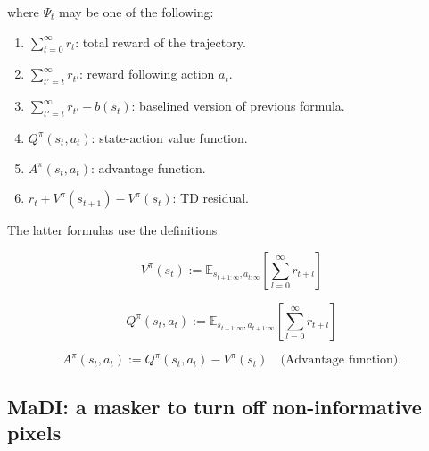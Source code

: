   where $\Psi_t$ may be one of the following:

  \begin{multicols}{2}
    \begin{enumerate}
        \item $\sum_{t=0}^{\infty} r_t$: total reward of the trajectory.
        \item $\sum_{t'=t}^{\infty} r_{t'}$: reward following action $a_t$.
        \item $\sum_{t'=t}^{\infty} r_{t'} - b(s_t)$: baselined version of previous formula.
        \item $Q^{\pi}(s_t, a_t)$: state-action value function.
        \item $A^{\pi}(s_t, a_t)$: advantage function.
        \item $r_t + V^{\pi}(s_{t+1}) - V^{\pi}(s_t)$: TD residual.
    \end{enumerate}
  \end{multicols}

  The latter formulas use the definitions
  
  \begin{equation}
  V^{\pi}(s_t) := \mathbb{E}_{s_{t+1:\infty}, a_{t:\infty}} \left[ \sum_{l=0}^{\infty} r_{t+l} \right]
  \end{equation}
  
  \begin{equation}
  Q^{\pi}(s_t, a_t) := \mathbb{E}_{s_{t+1:\infty}, a_{t+1:\infty}} \left[ \sum_{l=0}^{\infty} r_{t+l} \right]
  \end{equation}
  
  \begin{equation}
  A^{\pi}(s_t, a_t) := Q^{\pi}(s_t, a_t) - V^{\pi}(s_t) \quad \text{(Advantage function).}
  \end{equation}




\subsection{MaDI: a masker to turn off non-informative pixels}

